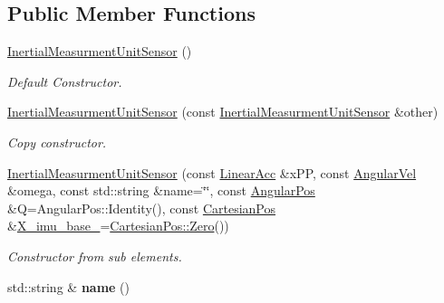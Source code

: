 \subsection*{Public Member Functions}
\begin{DoxyCompactItemize}
\item 
\hyperlink{classow__core_1_1InertialMeasurmentUnitSensor_aecdb8220ed3a0740046d4c9f5f57019b}{Inertial\+Measurment\+Unit\+Sensor} ()\hypertarget{classow__core_1_1InertialMeasurmentUnitSensor_aecdb8220ed3a0740046d4c9f5f57019b}{}\label{classow__core_1_1InertialMeasurmentUnitSensor_aecdb8220ed3a0740046d4c9f5f57019b}

\begin{DoxyCompactList}\small\item\em Default Constructor. \end{DoxyCompactList}\item 
\hyperlink{classow__core_1_1InertialMeasurmentUnitSensor_a5bfdb3db7462c5b0d4b2c31f18969e6f}{Inertial\+Measurment\+Unit\+Sensor} (const \hyperlink{classow__core_1_1InertialMeasurmentUnitSensor}{Inertial\+Measurment\+Unit\+Sensor} \&other)\hypertarget{classow__core_1_1InertialMeasurmentUnitSensor_a5bfdb3db7462c5b0d4b2c31f18969e6f}{}\label{classow__core_1_1InertialMeasurmentUnitSensor_a5bfdb3db7462c5b0d4b2c31f18969e6f}

\begin{DoxyCompactList}\small\item\em Copy constructor. \end{DoxyCompactList}\item 
\hyperlink{classow__core_1_1InertialMeasurmentUnitSensor_a03ef8fc2f5d85cd7d323ad59e17bce0d}{Inertial\+Measurment\+Unit\+Sensor} (const \hyperlink{classow__core_1_1LinearAcceleration}{Linear\+Acc} \&x\+PP, const \hyperlink{classow__core_1_1AngularVelocity}{Angular\+Vel} \&omega, const std\+::string \&name=\char`\"{}\char`\"{}, const \hyperlink{classow__core_1_1AngularPosition}{Angular\+Pos} \&Q=Angular\+Pos\+::\+Identity(), const \hyperlink{classow__core_1_1CartesianPosition}{Cartesian\+Pos} \&\hyperlink{classow__core_1_1InertialMeasurmentUnitSensor_a109c0d08ff803b326ccf1d2af44274c2}{X\+\_\+imu\+\_\+base\+\_\+}=\hyperlink{classow__core_1_1CartesianPosition_a58f4841421e4711b905ef7cdd4d5b8d8}{Cartesian\+Pos\+::\+Zero}())\hypertarget{classow__core_1_1InertialMeasurmentUnitSensor_a03ef8fc2f5d85cd7d323ad59e17bce0d}{}\label{classow__core_1_1InertialMeasurmentUnitSensor_a03ef8fc2f5d85cd7d323ad59e17bce0d}

\begin{DoxyCompactList}\small\item\em Constructor from sub elements. \end{DoxyCompactList}\item 
std\+::string \& {\bfseries name} ()\hypertarget{classow__core_1_1InertialMeasurmentUnitSensor_ae65851c93d5de55c3c7e25004e6ce5af}{}\label{classow__core_1_1InertialMeasurmentUnitSensor_ae65851c93d5de55c3c7e25004e6ce5af}


\end{DoxyCompactItemize}
